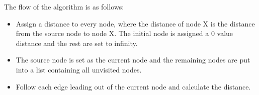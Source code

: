 The flow of the algorithm is as follows:
\begin{itemize}
\item Assign a distance to every node, where the distance of node X is the distance from the source node to node X. The initial node is assigned a 0 value distance and the rest are set to infinity.
\item The source node is set as the current node and the remaining nodes are put into a list containing all unvisited nodes.
\item Follow each edge leading out of the current node and calculate the distance. 
\end{itemize}







